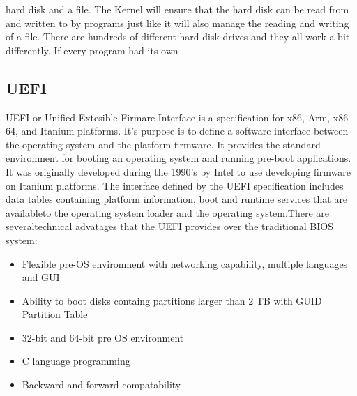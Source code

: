 hard disk and a
file. The Kernel will ensure that the hard disk can be read from and written
to by programs just like it will also manage the reading and writing of a
file. There are hundreds of different hard disk drives and they all work a
bit differently. If every program had its own 

\subsection{UEFI}

UEFI or Unified Extesible Firmare Interface is a specification for x86, Arm, x86-64, and Itanium platforms. It's purpose is to define a
software interface between the operating system and the platform firmware. It provides the standard environment for booting an 
operating system and running pre-boot applications. It was originally developed during the 1990's by Intel to use developing firmware
on Itanium platforms. The interface defined by the UEFI specification includes data tables containing platform information, boot and runtime services that are availableto the operating system loader and the operating system.There are  severaltechnical advatages that
the UEFI provides over the traditional BIOS system: 

\begin{itemize}

\item Flexible pre-OS environment with networking capability, multiple languages and GUI
\item Ability to boot disks containg partitions larger than 2 TB with GUID Partition Table
\item 32-bit and 64-bit pre OS environment
\item C language programming
\item Backward and forward compatability

\end{itemize}

